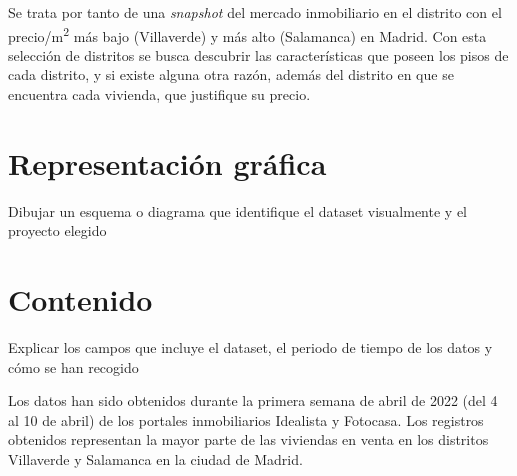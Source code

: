\documentclass[12pt]{article}
\begin{document}
Se trata por tanto de una \textit{snapshot} del mercado inmobiliario en el distrito con el precio/m\textsuperscript{2} más bajo (Villaverde) y más alto (Salamanca) en Madrid. Con esta selección de distritos se busca descubrir las características que poseen los pisos de cada distrito, y si existe alguna otra razón, además del distrito en que se encuentra cada vivienda, que justifique su precio.

\vspace{-1.5em}\section{Representación gráfica}\vspace{-1.5em}

Dibujar un esquema o diagrama que identifique el
dataset visualmente y el proyecto elegido

\vspace{-1.5em}\section{Contenido}\vspace{-1.5em}

Explicar los campos que incluye el dataset, el periodo de tiempo de los datos y cómo se han recogido

Los datos han sido obtenidos durante la primera semana de abril de 2022 (del 4 al 10 de abril) de los portales inmobiliarios Idealista y Fotocasa. Los registros obtenidos representan la mayor parte de las viviendas en venta en los distritos Villaverde y Salamanca en la ciudad de Madrid.
\end{document}
